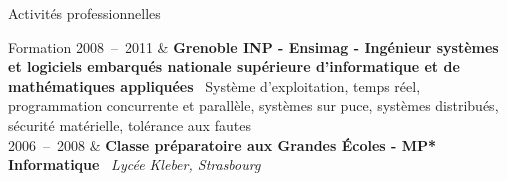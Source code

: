 \documentclass{cv}
\newcommand{\lieu}[1]{\textsl{#1}\ }
\newcommand{\activite}[1]{\textbf{#1}\ }
\newcommand{\comment}[1]{{#1}\ }
\newcommand{\group}[1]{\hspace{1em}\textsl{#1}\ }
\newcommand{\hs}{\hspace{1.6em}}
\begin{document}
\begin{rubriquetableau}[2.5cm]{Activités professionnelles}
%


%

\end{rubriquetableau}


\begin{rubriquetableau}[2.5cm]{Formation}
2008~--~2011
                        & \activite{Grenoble INP - Ensimag - Ingénieur systèmes et logiciels embarqués
                        \newlineÉcole nationale supérieure d'informatique et de mathématiques appliquées}
                        \comment{\newline Système d'exploitation, temps réel, programmation concurrente et parallèle, systèmes sur puce, systèmes distribués, sécurité matérielle, tolérance aux fautes} \\

2006~--~2008            & \activite{Classe préparatoire aux Grandes Écoles - MP* Informatique} \lieu{ Lycée Kleber, Strasbourg}
\end{rubriquetableau}
\end{document}

